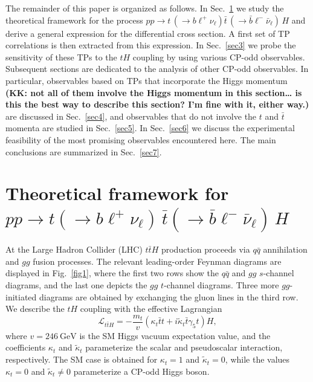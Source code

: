 \documentclass[aps,preprint,tightenlines,floatfix,superscriptaddress,nofootinbib,showpacs]{revtex4-1}
\def\beq{\begin{equation}}
\def\eeq{\end{equation}}
\def\tbar{\bar{t}}
\def\bbar{\bar{b}}
\def\nubar{{\bar{\nu}}_{\ell}}
\def\ppprocess{pp\to t\,\left(\rightarrow b {\ell}^+ \nu_{\ell}\right) \tbar\,\left(\rightarrow\bbar {\ell}^-\nubar\right)\,H}
\def\kp{\kappa_t}
\def\kpt{\tilde{\kappa}_t}
\begin{document}
The remainder of this paper is organized as follows. In
Sec.~\ref{sec2} we study the theoretical framework for the process
$\ppprocess$ and derive a general expression for the differential
cross section.  A first set of TP correlations is then
extracted from this expression.
In Sec.~\ref{sec3} we probe the sensitivity of these TPs to
the $tH$ coupling by using various $\mathrm{CP}$-odd
observables. Subsequent sections are dedicated to the analysis of
other $\mathrm{CP}$-odd observables. In particular,
observables based on TPs that incorporate the Higgs momentum
{\bf (KK: not all of them involve the Higgs momentum in this section\ldots
  is this the best way to describe this section?
  I'm fine with it, either way.)} are
discussed in Sec.~\ref{sec4}, and observables that do not
involve the $t$ and $\tbar$ momenta are studied in
Sec.~\ref{sec5}.  In Sec.~\ref{sec6} we discuss
the experimental feasibility of the most promising observables
encountered here. The main conclusions are summarized in
Sec.~\ref{sec7}.

\setlength{\abovedisplayskip}{10.6pt}
\setlength{\belowdisplayskip}{10.6pt}
\section{Theoretical framework for \MakeLowercase{{\boldmath $pp\to t(\to b {\ell}^+ \nu_{\ell})\,\bar{t}(\to\bar{b} {\ell}^-\bar{\nu}_{\ell})$}}$\,H$}
\label{sec2}


At the Large Hadron Collider (LHC) $t\bar{t}H$ production proceeds via $q\bar{q}$
annihilation and $gg$ fusion processes. The relevant leading-order Feynman
diagrams are displayed in Fig.~\ref{fig1}, where the first two
rows show the $q\bar{q}$ and $gg$ $s$-channel diagrams, and
the last one depicts the $gg$ $t$-channel diagrams.  Three more
$gg$-initiated diagrams are obtained by exchanging the gluon
lines in the third row.
We describe the $tH$ coupling with the effective Lagrangian
%
\beq
\label{eq1}
\mathcal{L}_{t\bar{t}H}=-\frac{m_t}{v}(\kp \tbar t+i\kpt \tbar
\gamma_5 t)H,
\eeq
%
where $v=246~\mathrm{GeV}$ is the SM Higgs vacuum
expectation value, and the coefficients $\kp$ and $\kpt$ parameterize 
the scalar and pseudoscalar interaction, respectively. The
SM case is obtained for $\kp=1$ and $\kpt=0$, while the values $\kp=0$
and $\kpt\neq 0$ parameterize a $\mathrm{CP}$-odd Higgs boson.
\end{document}

